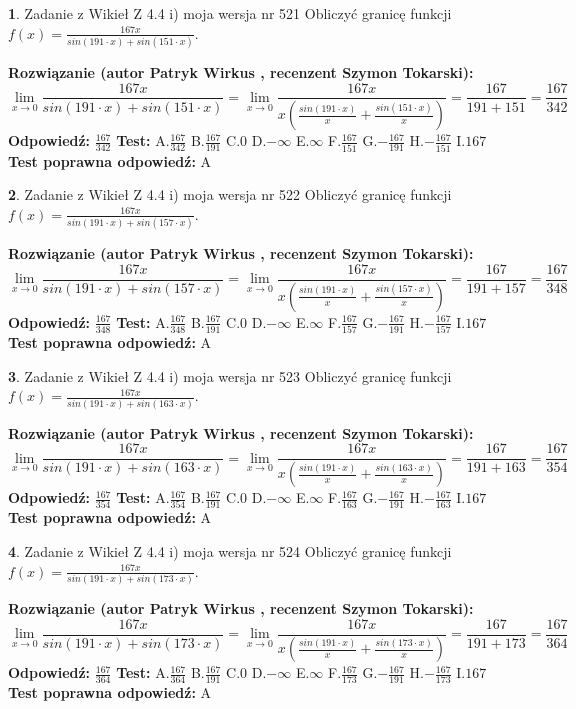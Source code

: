 \documentclass[12pt, a4paper]{article}
\theoremstyle{definition} %
\newtheorem{zad}{}
\newcommand{\zadStart}[1]{\begin{zad}#1\newline}
\newcommand{\zadStop}{\end{zad}}
\newcommand{\rozwStart}[2]{\noindent \textbf{Rozwiązanie (autor #1 , recenzent #2): }\newline}
\newcommand{\rozwStop}{\newline}
\newcommand{\odpStart}{\noindent \textbf{Odpowiedź:}\newline}
\newcommand{\odpStop}{\newline}
\newcommand{\testStart}{\noindent \textbf{Test:}\newline}
\newcommand{\testStop}{\newline}
\newcommand{\kluczStart}{\noindent \textbf{Test poprawna odpowiedź:}\newline}
\newcommand{\kluczStop}{\newline}
\begin{document}
\zadStart{Zadanie z Wikieł Z 4.4 i) moja wersja nr 521}
Obliczyć granicę funkcji $f(x)=\frac{167x}{sin(191\cdot x) +sin(151\cdot x)}$.
\zadStop
\rozwStart{Patryk Wirkus}{Szymon Tokarski}
$$\lim\limits_{x\to 0}\frac{167x}{sin(191\cdot x) +sin(151\cdot x)}=\lim\limits_{x\to 0}\frac{167x}{x(\frac{sin(191\cdot x)}{x}+\frac{sin(151\cdot x)}{x})}=\frac{167}{191+151} = \frac{167}{342}$$
\rozwStop
\odpStart
$\frac{167}{342}$
\odpStop
\testStart
A.$\frac{167}{342}$
B.$\frac{167}{191}$
C.$0$
D.$-\infty$
E.$\infty$
F.$\frac{167}{151}$
G.$-\frac{167}{191}$
H.$-\frac{167}{151}$
I.$167$
\testStop
\kluczStart
A
\kluczStop



\zadStart{Zadanie z Wikieł Z 4.4 i) moja wersja nr 522}
Obliczyć granicę funkcji $f(x)=\frac{167x}{sin(191\cdot x) +sin(157\cdot x)}$.
\zadStop
\rozwStart{Patryk Wirkus}{Szymon Tokarski}
$$\lim\limits_{x\to 0}\frac{167x}{sin(191\cdot x) +sin(157\cdot x)}=\lim\limits_{x\to 0}\frac{167x}{x(\frac{sin(191\cdot x)}{x}+\frac{sin(157\cdot x)}{x})}=\frac{167}{191+157} = \frac{167}{348}$$
\rozwStop
\odpStart
$\frac{167}{348}$
\odpStop
\testStart
A.$\frac{167}{348}$
B.$\frac{167}{191}$
C.$0$
D.$-\infty$
E.$\infty$
F.$\frac{167}{157}$
G.$-\frac{167}{191}$
H.$-\frac{167}{157}$
I.$167$
\testStop
\kluczStart
A
\kluczStop



\zadStart{Zadanie z Wikieł Z 4.4 i) moja wersja nr 523}
Obliczyć granicę funkcji $f(x)=\frac{167x}{sin(191\cdot x) +sin(163\cdot x)}$.
\zadStop
\rozwStart{Patryk Wirkus}{Szymon Tokarski}
$$\lim\limits_{x\to 0}\frac{167x}{sin(191\cdot x) +sin(163\cdot x)}=\lim\limits_{x\to 0}\frac{167x}{x(\frac{sin(191\cdot x)}{x}+\frac{sin(163\cdot x)}{x})}=\frac{167}{191+163} = \frac{167}{354}$$
\rozwStop
\odpStart
$\frac{167}{354}$
\odpStop
\testStart
A.$\frac{167}{354}$
B.$\frac{167}{191}$
C.$0$
D.$-\infty$
E.$\infty$
F.$\frac{167}{163}$
G.$-\frac{167}{191}$
H.$-\frac{167}{163}$
I.$167$
\testStop
\kluczStart
A
\kluczStop



\zadStart{Zadanie z Wikieł Z 4.4 i) moja wersja nr 524}
Obliczyć granicę funkcji $f(x)=\frac{167x}{sin(191\cdot x) +sin(173\cdot x)}$.
\zadStop
\rozwStart{Patryk Wirkus}{Szymon Tokarski}
$$\lim\limits_{x\to 0}\frac{167x}{sin(191\cdot x) +sin(173\cdot x)}=\lim\limits_{x\to 0}\frac{167x}{x(\frac{sin(191\cdot x)}{x}+\frac{sin(173\cdot x)}{x})}=\frac{167}{191+173} = \frac{167}{364}$$
\rozwStop
\odpStart
$\frac{167}{364}$
\odpStop
\testStart
A.$\frac{167}{364}$
B.$\frac{167}{191}$
C.$0$
D.$-\infty$
E.$\infty$
F.$\frac{167}{173}$
G.$-\frac{167}{191}$
H.$-\frac{167}{173}$
I.$167$
\testStop
\kluczStart
A
\kluczStop
\end{document}
